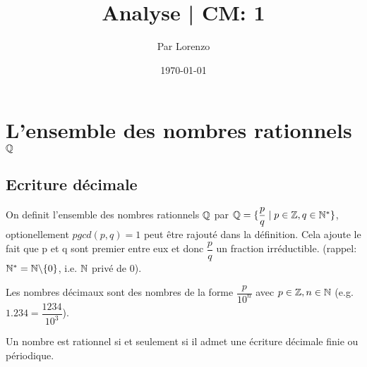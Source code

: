 \documentclass[a4paper, 12pt]{article}
\title{Analyse | CM: 1}
\author{Par Lorenzo}
\date{\today}
\begin{document}
\maketitle

\section{L'ensemble des nombres rationnels $\mathbb{Q}$}

\subsection{Ecriture décimale}

\begin{definition}
    On definit l'ensemble des nombres rationnels $\mathbb{Q}$ par \break
    $\mathbb{Q} = \{\dfrac{p}{q} \mid p \in \mathbb{Z}, q \in \mathbb{N}^*\}$,
    optionellement $pgcd(p, q) = 1$ peut être rajouté dans la définition.
    Cela ajoute le fait que p et q sont premier entre eux et donc $\dfrac{p}{q}$ un fraction irréductible.
    (rappel: $\mathbb{N}^*=\mathbb{N}\backslash\{0\}$, i.e. $\mathbb{N}$ privé de 0).
\end{definition}

\begin{remark}
    Les nombres décimaux sont des nombres de la forme \break $\dfrac{p}{10^n}$ avec $p \in \mathbb{Z}, n \in \mathbb{N}$
    (e.g. $1.234 = \dfrac{1234}{10^3}$).
\end{remark}

\begin{proposition}
    Un nombre est rationnel si et seulement si il admet une écriture décimale finie ou périodique.
\end{proposition}
\end{document}
